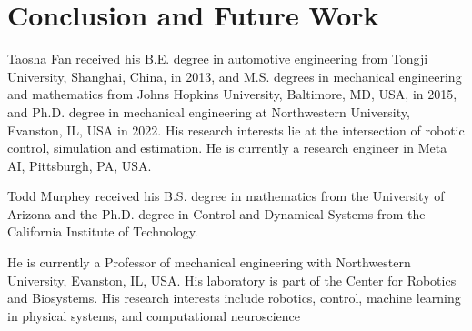 \documentclass[journal]{IEEEtran}
\begin{document}
	\section{Conclusion and Future Work}\label{section::conclusion}
	
	
	\vspace{-0.25em}
	
	
	
	
	\vspace{-1.5em}
	
	\begin{IEEEbiography}{Taosha Fan}
		received his B.E. degree in automotive engineering from Tongji University, Shanghai, China, in 2013, and M.S. degrees in mechanical engineering and mathematics from Johns Hopkins University, Baltimore, MD, USA, in 2015, and Ph.D. degree in mechanical engineering at Northwestern University, Evanston, IL, USA in 2022. His research interests lie at the intersection of robotic control, simulation and estimation. He is currently a research engineer in Meta AI, Pittsburgh, PA, USA.
	\end{IEEEbiography}
	
	\begin{IEEEbiography}{Todd Murphey}
		received his B.S. degree in mathematics from the University of Arizona and the Ph.D. degree in Control and Dynamical Systems from the California Institute of Technology.
		
		He is currently a Professor of mechanical engineering with Northwestern University, Evanston, IL, USA. His laboratory is part of the Center for Robotics and Biosystems. His research interests include robotics, control, machine learning in physical systems, and computational neuroscience
	\end{IEEEbiography}
	
	
	
	
	
	
\end{document}
